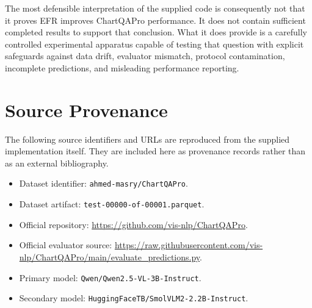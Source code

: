 \documentclass[11pt,a4paper]{article}
\newcommand{\code}[1]{\texttt{#1}}
\begin{document}
The most defensible interpretation of the supplied code is consequently not that it proves EFR improves ChartQAPro performance. It does not contain sufficient completed results to support that conclusion. What it does provide is a carefully controlled experimental apparatus capable of testing that question with explicit safeguards against data drift, evaluator mismatch, protocol contamination, incomplete predictions, and misleading performance reporting.

\section*{Source Provenance}
The following source identifiers and URLs are reproduced from the supplied implementation itself. They are included here as provenance records rather than as an external bibliography.

\begin{itemize}
\item Dataset identifier: \code{ahmed-masry/ChartQAPro}.
\item Dataset artifact: \code{test-00000-of-00001.parquet}.
\item Official repository: \url{https://github.com/vis-nlp/ChartQAPro}.
\item Official evaluator source: \url{https://raw.githubusercontent.com/vis-nlp/ChartQAPro/main/evaluate_predictions.py}.
\item Primary model: \code{Qwen/Qwen2.5-VL-3B-Instruct}.
\item Secondary model: \code{HuggingFaceTB/SmolVLM2-2.2B-Instruct}.
\end{itemize}
\end{document}
